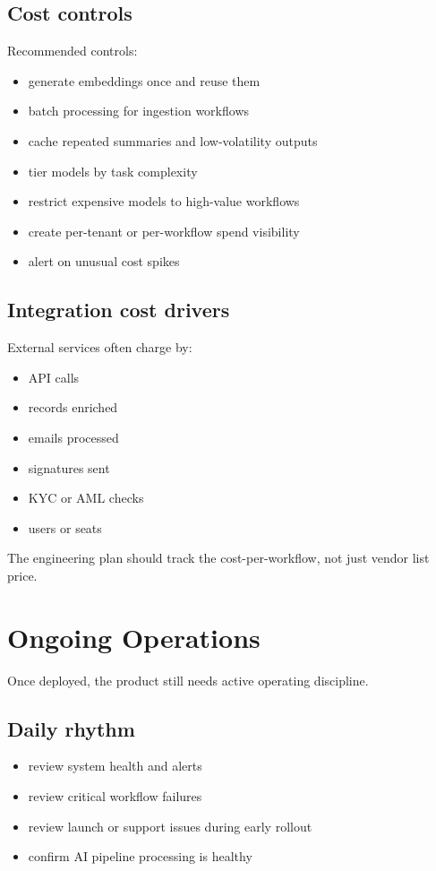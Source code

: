 \documentclass[11pt]{article}
\begin{document}
\subsection{Cost controls}

Recommended controls:

\begin{itemize}
\item generate embeddings once and reuse them
\item batch processing for ingestion workflows
\item cache repeated summaries and low-volatility outputs
\item tier models by task complexity
\item restrict expensive models to high-value workflows
\item create per-tenant or per-workflow spend visibility
\item alert on unusual cost spikes
\end{itemize}

\subsection{Integration cost drivers}

External services often charge by:

\begin{itemize}
\item API calls
\item records enriched
\item emails processed
\item signatures sent
\item KYC or AML checks
\item users or seats
\end{itemize}

The engineering plan should track the cost-per-workflow, not just vendor list price.

\section{Ongoing Operations}

Once deployed, the product still needs active operating discipline.

\subsection{Daily rhythm}

\begin{itemize}
\item review system health and alerts
\item review critical workflow failures
\item review launch or support issues during early rollout
\item confirm AI pipeline processing is healthy
\end{itemize}
\end{document}
